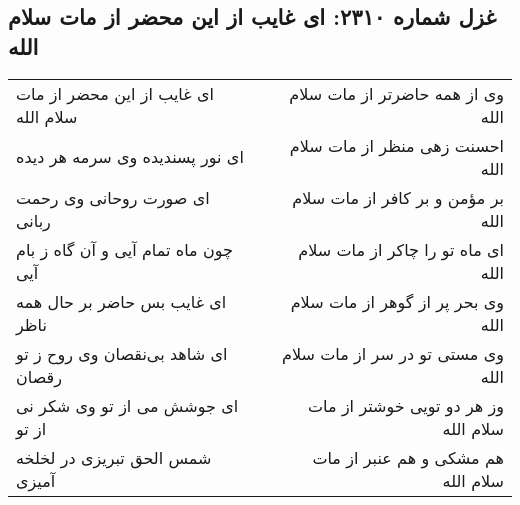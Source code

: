 \begin{center}
\section*{غزل شماره ۲۳۱۰: ای غایب از این محضر از مات سلام الله}
\label{sec:2310}
\begin{longtable}{l p{0.5cm} r}
ای غایب از این محضر از مات سلام الله
&&
وی از همه حاضرتر از مات سلام الله
\\
ای نور پسندیده وی سرمه هر دیده
&&
احسنت زهی منظر از مات سلام الله
\\
ای صورت روحانی وی رحمت ربانی
&&
بر مؤمن و بر کافر از مات سلام الله
\\
چون ماه تمام آیی و آن گاه ز بام آیی
&&
ای ماه تو را چاکر از مات سلام الله
\\
ای غایب بس حاضر بر حال همه ناظر
&&
وی بحر پر از گوهر از مات سلام الله
\\
ای شاهد بی‌نقصان وی روح ز تو رقصان
&&
وی مستی تو در سر از مات سلام الله
\\
ای جوشش می از تو وی شکر نی از تو
&&
وز هر دو تویی خوشتر از مات سلام الله
\\
شمس الحق تبریزی در لخلخه آمیزی
&&
هم مشکی و هم عنبر از مات سلام الله
\\
\end{longtable}
\end{center}
